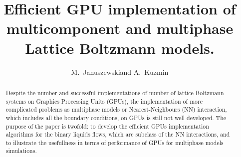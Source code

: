 \documentclass[mathpazo,sort,numbers]{cicp}
\begin{document}
\title{Efficient GPU implementation of multicomponent and multiphase Lattice Boltzmann models.}

\author[M.~Januszewski and A.~Kuzmin]{M.~Januszewski\corrauth and A.~Kuzmin}
\address{\ Institute of Physics, University of Silesia, 40-007 Katowice, Poland\\
\ Department of Mechanical and Manufacturing Engineering,
Schulich School of Engineering,
University of Calgary, 2500 University Drive NW ,Calgary, Alberta, T2N 1N4 Canada
}



\begin{abstract}
Despite the number and successful implementations of number of lattice Boltzmann systems on Graphics Processing Units (GPUs), the implementation of more complicated problems as multiphase models or Nearest-Neighbours (NN) interaction, which includes all the boundary conditions, on GPUs is still not well developed. The purpose of the paper is twofold: to develop the efficient GPUs implementation algorithms for the binary liquids flows, which are subclass of the NN interactions, and to illustrate the usefullness in terms of performance of GPUs for multiphase models simulations.
\end{abstract}
\end{document}
